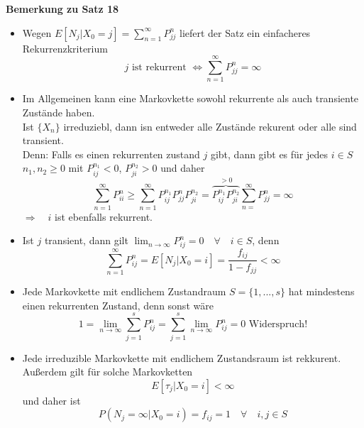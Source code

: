 \documentclass[a4paper,12pt]{article}
\begin{document}
\textbf{Bemerkung zu Satz 18}\\
\begin{itemize}
	\item Wegen $E[N_j| X_0 = j ] = \sum_{n=1}^{\infty} P_{jj}^n$ liefert der Satz ein einfacheres Rekurrenzkriterium
	      $$
		      j \text{ ist rekurrent } \Leftrightarrow \sum_{n=1}^{\infty} P_{jj}^n = \infty
	      $$
	\item Im Allgemeinen kann eine Markovkette sowohl rekurrente als auch transiente Zustände haben.\\
	      Ist $\{X_n\}$ irreduziebl, dann isn entweder alle Zustände rekurent oder alle sind transient.\\
	      Denn: Falls es einen rekurrenten zustand $j$ gibt, dann gibt es für jedes $i \in S$ $n_1,n_2 \geq 0$ mit $P_{ij}^{n_1} < 0$, $P_{ji}^{n_2}> 0$ und daher
	      $$
		      \sum_{n=1}^{\infty}P_{ii}^n \geq \sum_{n=1}^{\infty}P_{ij}^{n_1}P_{jj}^nP_{ji}^{n_2}
		      = \overbrace{P_{ij}^{n_1}P_{ji}^{n_2}}^{>0}\sum_{n=}^{	\infty}P_{jj}^n = \infty
	      $$
	      $\Rightarrow \quad i$ ist ebenfalls rekurrent.
	\item Ist $j$ transient, dann gilt $\lim_{n \to \infty}P_{ij}^n = 0 \quad \forall \quad i \in S$, denn
	      $$
		      \sum_{n=1}^{\infty}P_{ij}^n = E\left[N_j |X_0 = i\right] = \frac{f_{ij}}{1-f_{jj}} < \infty
	      $$
	\item Jede Markovkette mit endlichem Zustandraum $S = \{1, ..., s\}$ hat mindestens einen rekurrenten Zustand, denn sonst wäre
	      $$
		      1 = \lim_{n \to \infty}\sum_{j=1}^{s}P_{ij}^n = \sum_{j=1}^{s} \lim_{n \to \infty} P_{ij}^n = 0 \text{ Widerspruch!}
	      $$
	\item Jede irreduzible Markovkette mit endlichem Zustandsraum ist rekkurent.
	      Außerdem gilt für solche Markovketten
	      $$
		      E[\tau_j | X_0 = i] < \infty
	      $$
	      und daher ist
	      $$
		      P(N_j = \infty | X_0 = i) = f_{ij} = 1 \quad \forall \quad i,j \in S
	      $$
\end{itemize}
\end{document}
